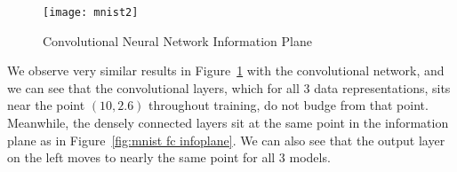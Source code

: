 \begin{figure}[h!]
\begin{center}
\texttt{[image: mnist2]}
\caption{Convolutional Neural Network Information Plane}
\label{fig:mnist conv infoplane}
\centering
\end{center}
\end{figure}

We observe very similar results in Figure~\ref{fig:mnist conv infoplane} with the convolutional network, and we can see that the convolutional layers, which for all 3 data representations, sits near the point $(10, 2.6)$ throughout training, do not budge from that point. 
Meanwhile, the densely connected layers sit at the same point in the information plane as in Figure~\ref{fig:mnist fc infoplane}.
We can also see that the output layer on the left moves to nearly the same point for all 3 models.